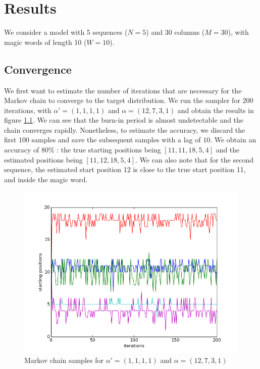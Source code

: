 
\chapter{Results} %

\label{Results} %


 We consider a model with 5 sequences ($N=5$) and 30 columns ($M=30$), with magic words of length 10 ($W= 10 $). 
 
 \section{Convergence}
 We first want to estimate the number of iterations that are necessary for the Markov chain to converge to the target distribution. We run the sampler for 200 iterations, with $\alpha' = (1, 1,1,1)$ and $\alpha = (12,7,3,1)$ and obtain the results in figure \ref{fig:1}. We can see that the burn-in period is almost undetectable and the chain converges rapidly. Nonetheless, to estimate the accuracy, we discard the first $100$ samples and save the subsequent samples with a lag of $10$. We obtain an accuracy of $80\%$ : the true starting positions being $[11, 11, 18, 5, 4]$ and the estimated positions being $[11, 12, 18, 5, 4]$. We can also note that for the second sequence, the estimated start position 12 is close to the true start position 11, and inside the magic word.
 \begin{figure}[htbp]
  \centering
    \includegraphics[scale = 0.75]{Figures/fig1}
  \caption{Markov chain samples for $\alpha' = (1, 1,1,1)$ and $\alpha = (12,7,3,1)$}
  \label{fig:1}
\end{figure}

